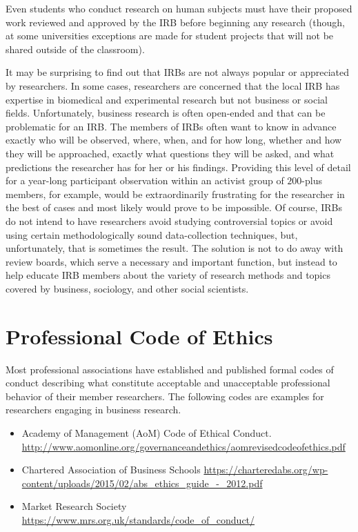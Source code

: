 Even students who conduct research on human subjects must have their proposed work reviewed and approved by the \ac{IRB} before beginning any research (though, at some universities exceptions are made for student projects that will not be shared outside of the classroom).

It may be surprising to find out that \acp{IRB} are not always popular or appreciated by researchers. In some cases, researchers are concerned that the local \ac{IRB} has expertise in biomedical and experimental research but not business or social fields. Unfortunately, business research is often open-ended and that can be problematic for an \ac{IRB}. The members of \acp{IRB} often want to know in advance exactly who will be observed, where, when, and for how long, whether and how they will be approached, exactly what questions they will be asked, and what predictions the researcher has for her or his findings. Providing this level of detail for a year-long participant observation within an activist group of $ 200 $-plus members, for example, would be extraordinarily frustrating for the researcher in the best of cases and most likely would prove to be impossible. Of course, \acp{IRB} do not intend to have researchers avoid studying controversial topics or avoid using certain methodologically sound data-collection techniques, but, unfortunately, that is sometimes the result. The solution is not to do away with review boards, which serve a necessary and important function, but instead to help educate \ac{IRB} members about the variety of research methods and topics covered by business, sociology, and other social scientists.

\section{Professional Code of Ethics}

Most professional associations have established and published formal codes of conduct describing what constitute acceptable and unacceptable professional behavior of their member researchers. The following codes are examples for researchers engaging in business research.

\begin{itemize}
	\item Academy of Management (AoM) Code of Ethical Conduct. \url{http://www.aomonline.org/governanceandethics/aomrevisedcodeofethics.pdf}
	\item Chartered Association of Business Schools \url{https://charteredabs.org/wp-content/uploads/2015/02/abs_ethics_guide_-_2012.pdf}
	\item Market Research Society \url{https://www.mrs.org.uk/standards/code_of_conduct/}
\end{itemize}


